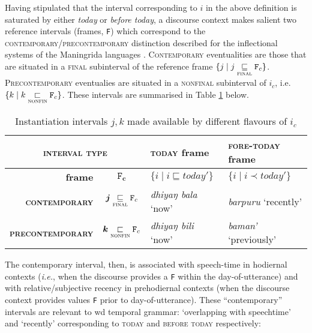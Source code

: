 Having stipulated that the interval corresponding to $ i $ in the above definition is saturated by either \textsl{today} or \textsl{before today}, a discourse context makes salient two reference intervals (frames, \texttt{F}) which correspond to the \textsc{contemporary/precontemporary} distinction described for the inflectional systems of the Maningrida languages \citep{Glasgow1964,Eather2011,Green1995}. \textsc{Contemporary} eventualities are those that are situated in a \textsc{final} subinterval of the reference frame $ \{j\mid j\underset{\textsc{final}}\sqsubseteq \mathtt{F}_c\} $. \textsc{Precontemporary} eventualies are situated in a \textsc{nonfinal} subinterval of $ i_c $, i.e. $ \{k\mid k\underset{\textsc{nonfin}}{\sqsubset}\mathtt{F}_c\}$. These intervals are summarised in Table \ref{InstInts} below.


\begin{table}[h]
	\caption{Instantiation intervals $ j,k $ made available by different flavours of $ i_c $}\centering\label{InstInts}
\begingroup	\renewcommand{\arraystretch}{1.75} 
	\begin{tabular}{rc|ll}\toprule
		\multicolumn{2}{c}{\textsc{interval type}} & \textsc{today} frame & \textsc{fore-today} frame\\\midrule
		\textbf{frame} &$ \boldsymbol{\mathtt{F}_c} $ & $\{i\mid i\sqsubseteq\mathit{today'}\}$ & $\{i\mid i\prec\mathit{today'}\} $	\\%
		{\color{forest}\textbf{\textsc{contemporary}}} &$\boldsymbol j\underset{\textsc{final}}{\sqsubseteq}\mathtt{F}_c $ & \textit{dhiyaŋ bala} `now' & \textit{barpuru} `recently'	\\
		{\color{blue}\textbf{\textsc{precontemporary}}} &$ \boldsymbol k\underset{\textsc{nonfin}}{\sqsubset}\mathtt{F}_c $	& \textit{dhiyaŋ bili} `now' & \textit{baman'} `previously'	\\\bottomrule
	\end{tabular}\endgroup
\end{table}


The contemporary interval, then, is associated with speech-time in hodiernal contexts (\textit{i.e.}, when the discourse provides a \texttt{F} within the day-of-utterance) and with relative/subjective recency in prehodiernal contexts (when the discourse context provides values \texttt{F} prior to day-of-utterance). These ``contemporary'' intervals are relevant to \gls{wd} temporal grammar: `overlapping with speechtime' and `recently' corresponding to \textsc{today} and \textsc{before today} respectively:


